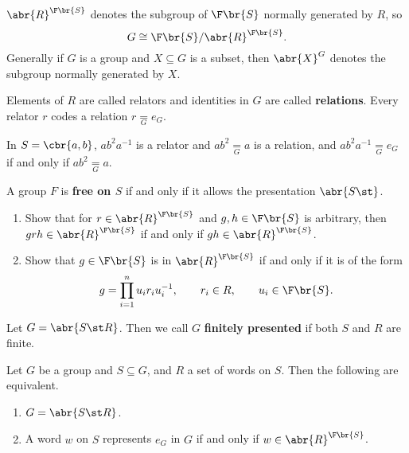 
\begin{notation*}
$ \abr{R}^{\F\br{S}} $ denotes the subgroup of $ \F\br{S} $ normally generated by $ R $, so
$$ G \cong \F\br{S} / \abr{R}^{\F\br{S}}. $$
Generally if $ G $ is a group and $ X \subseteq G $ is a subset, then $ \abr{X}^G $ denotes the subgroup normally generated by $ X $.
\end{notation*}

\begin{note*}
Elements of $ R $ are called relators and identities in $ G $ are called \textbf{relations}. Every relator $ r $ codes a relation $ r \underset{G}{=} e_G $.
\end{note*}

\begin{example*}
In $ S = \cbr{a, b} $, $ ab^2a^{-1} $ is a relator and $ ab^2 \underset{G}{=} a $ is a relation, and $ ab^2a^{-1} \underset{G}{=} e_G $ if and only if $ ab^2 \underset{G}{=} a $.
\end{example*}

\begin{remark}
A group $ F $ is \textbf{free on $ S $} if and only if it allows the presentation $ \abr{S \st} $.
\end{remark}

\begin{exercise}
\label{ex:1.5.3}
\hfill
\begin{enumerate}
\item Show that for $ r \in \abr{R}^{\F\br{S}} $ and $ g, h \in \F\br{S} $ is arbitrary, then $ grh \in \abr{R}^{\F\br{S}} $ if and only if $ gh \in \abr{R}^{\F\br{S}} $.
\item Show that $ g \in \F\br{S} $ is in $ \abr{R}^{\F\br{S}} $ if and only if it is of the form
$$ g = \prod_{i = 1}^n u_ir_iu_i^{-1}, \qquad r_i \in R, \qquad u_i \in \F\br{S}. $$
\end{enumerate}
\end{exercise}

\begin{definition}
Let $ G = \abr{S \st R} $. Then we call $ G $ \textbf{finitely presented} if both $ S $ and $ R $ are finite.
\end{definition}

\begin{remark}
\label{rem:1.5.5}
Let $ G $ be a group and $ S \subseteq G $, and $ R $ a set of words on $ S $. Then the following are equivalent.
\begin{enumerate}
\item $ G = \abr{S \st R} $.
\item A word $ w $ on $ S $ represents $ e_G $ in $ G $ if and only if $ w \in \abr{R}^{\F\br{S}} $.
\end{enumerate}
\end{remark}

